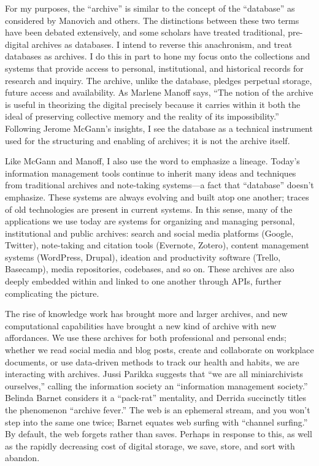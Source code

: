 For my purposes, the ``archive'' is similar to the concept of the ``database'' as considered by Manovich and others. The distinctions between these two terms have been debated extensively, and some scholars have treated traditional, pre-digital archives as databases.  I intend to reverse this anachronism, and treat databases as archives. I do this in part to hone my focus onto the collections and systems that provide access to personal, institutional, and historical records for research and inquiry. The archive, unlike the database, pledges perpetual storage, future access and availability. As Marlene Manoff says, ``The notion of the archive is useful in theorizing the digital precisely because it carries within it both the ideal of preserving collective memory and the reality of its impossibility.''  Following Jerome McGann's insights, I see the database as a technical instrument used for the structuring and enabling of archives; it is not the archive itself. 

Like McGann and Manoff, I also use the word to emphasize a lineage. Today's information management tools continue to inherit many ideas and techniques from traditional archives and note-taking systems—a fact that ``database'' doesn't emphasize. These systems are always evolving and built atop one another; traces of old technologies are present in current systems. In this sense, many of the applications we use today are systems for organizing and managing personal, institutional and public archives: search and social media platforms (Google, Twitter), note-taking and citation tools (Evernote, Zotero), content management systems (WordPress, Drupal), ideation and productivity software (Trello, Basecamp), media repositories, codebases, and so on. These archives are also deeply embedded within and linked to one another through APIs, further complicating the picture.

The rise of knowledge work has brought more and larger archives, and new computational capabilities have brought a new kind of archive with new affordances. We use these archives for both professional and personal ends; whether we read social media and blog posts, create and collaborate on workplace documents, or use data-driven methods to track our health and habits, we are interacting with archives. Jussi Parikka suggests that ``we are all miniarchivists ourselves,'' calling the information society an ``information management society.''  Belinda Barnet considers it a ``pack-rat'' mentality, and Derrida succinctly titles the phenomenon ``archive fever.'' The web is an ephemeral stream, and you won't step into the same one twice; Barnet equates web surfing with ``channel surfing.''\autocite{Barnet} By default, the web forgets rather than saves. Perhaps in response to this, as well as the rapidly decreasing cost of digital storage, we save, store, and sort with abandon.

